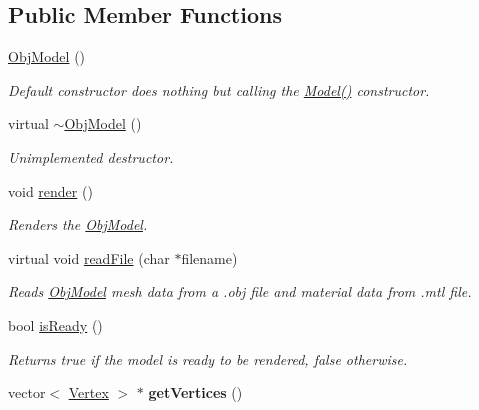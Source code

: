\subsection*{Public Member Functions}
\begin{DoxyCompactItemize}
\item 
\hypertarget{classObjModel_af7c00f757992e626f2dd959f4c829125}{\hyperlink{classObjModel_af7c00f757992e626f2dd959f4c829125}{Obj\-Model} ()}\label{classObjModel_af7c00f757992e626f2dd959f4c829125}

\begin{DoxyCompactList}\small\item\em Default constructor does nothing but calling the \hyperlink{classModel_ae3b375de5f6df4faf74a95d64748e048}{Model()} constructor. \end{DoxyCompactList}\item 
\hypertarget{classObjModel_a78d50e0da345b8b2438bbc93ae01eab8}{virtual \hyperlink{classObjModel_a78d50e0da345b8b2438bbc93ae01eab8}{$\sim$\-Obj\-Model} ()}\label{classObjModel_a78d50e0da345b8b2438bbc93ae01eab8}

\begin{DoxyCompactList}\small\item\em Unimplemented destructor. \end{DoxyCompactList}\item 
void \hyperlink{classObjModel_a490d057319a30734a0d6f27739f84565}{render} ()
\begin{DoxyCompactList}\small\item\em Renders the \hyperlink{classObjModel}{Obj\-Model}. \end{DoxyCompactList}\item 
virtual void \hyperlink{classObjModel_a99296bb22424ec9732ce3197991459d9}{read\-File} (char $\ast$filename)
\begin{DoxyCompactList}\small\item\em Reads \hyperlink{classObjModel}{Obj\-Model} mesh data from a .obj file and material data from .mtl file. \end{DoxyCompactList}\item 
\hypertarget{classObjModel_ad5cf8b20897f7d745ef5cf5121e1e3e2}{bool \hyperlink{classObjModel_ad5cf8b20897f7d745ef5cf5121e1e3e2}{is\-Ready} ()}\label{classObjModel_ad5cf8b20897f7d745ef5cf5121e1e3e2}

\begin{DoxyCompactList}\small\item\em Returns true if the model is ready to be rendered, false otherwise. \end{DoxyCompactList}\item 
\hypertarget{classObjModel_a2cd661ed082445bbee4bca792042693c}{vector$<$ \hyperlink{classVertex}{Vertex} $>$ $\ast$ {\bfseries get\-Vertices} ()}\label{classObjModel_a2cd661ed082445bbee4bca792042693c}

\end{DoxyCompactItemize}


